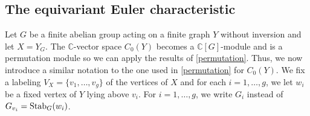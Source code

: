 \documentclass[11pt]{amsart}
\newtheorem{proposition}[theorem]{Proposition}
\numberwithin{equation}{section}
\theoremstyle{remark}
\theoremstyle{definition}
\begin{document}

\subsection{The equivariant Euler characteristic} \label{equiv_sec}
Let $G$ be a finite abelian group acting on a finite graph $Y$ without inversion and let $X = Y_{G}$.  The $\mathbb{C}$-vector space $C_{0}(Y)$ becomes a $\mathbb{C}[G]$-module and is a permutation module so we can apply the results of \cref{permutation}.  Thus, we now introduce a similar notation to the one used in \cref{permutation} for $C_{0}(Y)$.  We fix a labeling $V_{X} = \{v_{1},\ldots,v_{g} \}$ of the vertices of $X$ and for each $i = 1,\ldots,g$, we let $w_{i}$ be a fixed vertex of $Y$ lying above $v_{i}$.  For $i=1,\ldots,g$, we write $G_{i}$ instead of $G_{v_{i}} = {\rm Stab}_{G}(w_{i})$.
\end{document}
